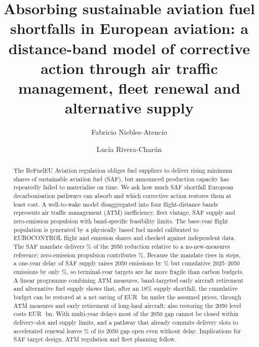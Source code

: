 \documentclass[preprint, 12pt, authoryear]{elsarticle}
\newif\ifanon
\newcommand{\EUR}[1]{EUR~#1}
\begin{document}
\begin{frontmatter}

\title{Absorbing sustainable aviation fuel shortfalls in European aviation:
a distance-band model of corrective action through air traffic management,
fleet renewal and alternative supply}

\ifanon
  \author{}
  \address{}
\else
  \author[uhh]{Fabricio Niebles-Atencio}
  \author[utec]{Luc\'{i}a Rivera-Char\'{u}n}
  \address[uhh]{Institute of Information Systems, Hamburg Business School,
    University of Hamburg, Von-Melle-Park 5, 20146 Hamburg, Germany}
  \address[utec]{Departamento de Ingenier\'ia Civil y Ambiental, Universidad de
    Ingenier\'ia y Tecnolog\'ia, Jr.\ Medrano Silva 165, Barranco, 15063 Lima, Peru}
\fi

\begin{abstract}
The ReFuelEU Aviation regulation obliges fuel suppliers to deliver rising
minimum shares of sustainable aviation fuel (SAF), but announced production
capacity has repeatedly failed to materialise on time. We ask how much SAF
shortfall European decarbonisation pathways can absorb and which corrective
action restores them at least cost. A well-to-wake model disaggregated into four
flight-distance bands represents air traffic management (ATM) inefficiency,
fleet vintage, SAF supply and zero-emission propulsion with band-specific
feasibility limits. The base-year flight population is generated by
a physically based fuel model calibrated to EUROCONTROL flight and emission
shares and checked against independent data. The SAF mandate delivers \ShPctSaf\% of the 2050 reduction relative to a
no-new-measures reference; zero-emission propulsion contributes \ShPctZep\%. Because the mandate rises in steps, a one-year delay of SAF supply
raises 2050 emissions by \DelayEndTwo\% but cumulative 2025--2050 emissions by
only \DelayCumTwo\%, so terminal-year targets are far more fragile than carbon
budgets. A linear programme combining ATM measures, band-targeted early aircraft
retirement and alternative fuel supply shows that, after an 18\% supply
shortfall, the cumulative budget can be restored at a net saving of
\EUR{\CorrNoDelayCumSaving}\,bn under the assumed prices, through ATM measures
and early retirement of long-haul aircraft; also restoring the 2050 level costs
\EUR{\CorrNoDelayCost}\,bn. With multi-year delays most of the 2050 gap cannot
be closed within delivery-slot and supply limits, and a pathway that already
commits delivery slots to accelerated renewal leaves \CorrThreeNoDelayResEnd\%
of its 2050 gap open even without delay. Implications for SAF target design, ATM regulation and fleet planning follow.
\end{abstract}


\end{frontmatter}
\end{document}
